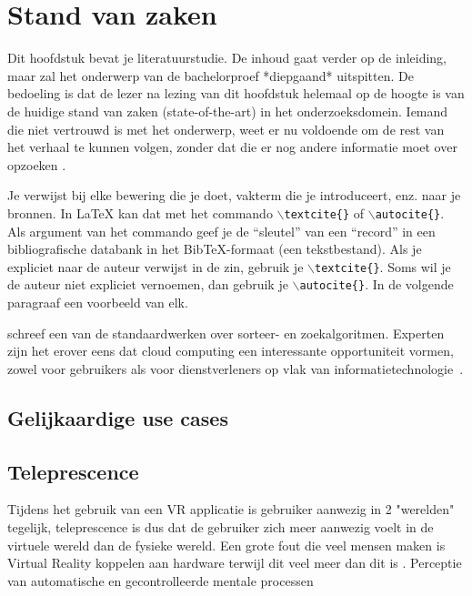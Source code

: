 \chapter{Stand van zaken}
\label{ch:stand-van-zaken}



Dit hoofdstuk bevat je literatuurstudie. De inhoud gaat verder op de inleiding, maar zal het onderwerp van de bachelorproef *diepgaand* uitspitten. De bedoeling is dat de lezer na lezing van dit hoofdstuk helemaal op de hoogte is van de huidige stand van zaken (state-of-the-art) in het onderzoeksdomein. Iemand die niet vertrouwd is met het onderwerp, weet er nu voldoende om de rest van het verhaal te kunnen volgen, zonder dat die er nog andere informatie moet over opzoeken \autocite{Pollefliet2011}.

Je verwijst bij elke bewering die je doet, vakterm die je introduceert, enz. naar je bronnen. In \LaTeX{} kan dat met het commando \texttt{$\backslash${textcite\{\}}} of \texttt{$\backslash${autocite\{\}}}. Als argument van het commando geef je de ``sleutel'' van een ``record'' in een bibliografische databank in het Bib\TeX{}-formaat (een tekstbestand). Als je expliciet naar de auteur verwijst in de zin, gebruik je \texttt{$\backslash${}textcite\{\}}.
Soms wil je de auteur niet expliciet vernoemen, dan gebruik je \texttt{$\backslash${}autocite\{\}}. In de volgende paragraaf een voorbeeld van elk.

\textcite{Knuth1998} schreef een van de standaardwerken over sorteer- en zoekalgoritmen. Experten zijn het erover eens dat cloud computing een interessante opportuniteit vormen, zowel voor gebruikers als voor dienstverleners op vlak van informatietechnologie~\autocite{Creeger2009}.

\section{Gelijkaardige use cases}

\section{Teleprescence}
Tijdens het gebruik van een VR applicatie is gebruiker aanwezig in 2 "werelden" tegelijk, teleprescence is dus dat de gebruiker zich meer aanwezig voelt in de virtuele wereld dan de fysieke wereld.
Een grote fout die veel mensen maken is Virtual Reality koppelen aan hardware terwijl dit veel meer dan dit is \autocite{Steuer1992}.
Perceptie van automatische en gecontrolleerde mentale processen

